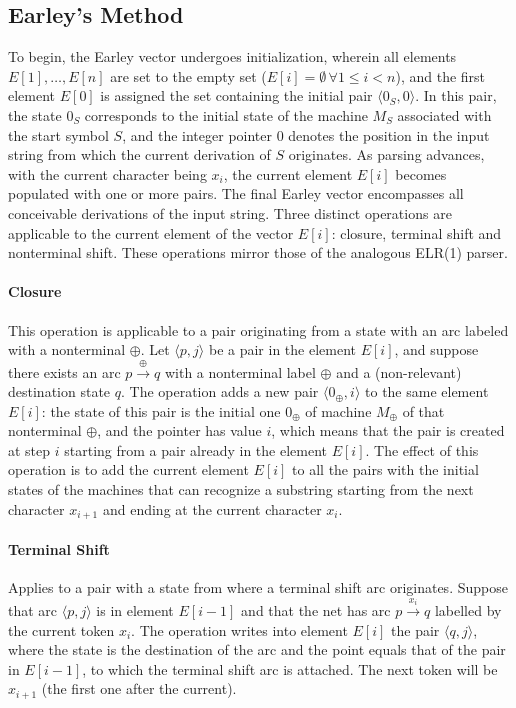 \subsection{Earley's Method}
To begin, the Earley vector undergoes initialization, wherein all elements $E[1],\dots, E[n]$ are set to the empty set ($E[i] = \emptyset \, \forall 1 \leq i < n$), and the first element $E[0]$ is assigned the set containing the initial pair $\langle 0_S, 0 \rangle$. 
In this pair, the state $0_S$ corresponds to the initial state of the machine $M_S$ associated with the start symbol $S$, and the integer pointer $0$ denotes the position in the input string from which the current derivation of $S$ originates.
As parsing advances, with the current character being $x_i$, the current element $E[i]$ becomes populated with one or more pairs.
The final Earley vector encompasses all conceivable derivations of the input string. 
Three distinct operations are applicable to the current element of the vector  $E[i]$: closure, terminal shift and nonterminal shift.
These operations mirror those of the analogous ELR(1) parser.

\paragraph*{Closure}
This operation is applicable to a pair originating from a state with an arc labeled with a nonterminal $\oplus$.
Let $\langle p, j \rangle$ be a pair in the element $E[i]$, and suppose there exists an arc $p \xrightarrow{\oplus} q$ with a nonterminal label $\oplus$ and a (non-relevant) destination state $q$.
The operation adds a new pair $\langle 0_\oplus, i \rangle$ to the same element $E[i]$: the state of this pair is the initial one $0_\oplus$ of machine $M_\oplus$ of that nonterminal $\oplus$, and the pointer has value $i$, which means that the pair is created at step $i$ starting from a pair already in the element $E[i]$.
The effect of this operation is to add the current element $E[i]$ to all the pairs with the initial states of the machines that can recognize a substring starting from the next character $x_{i+1}$ and ending at the current character $x_i$.

\paragraph*{Terminal Shift}
Applies to a pair with a state from where a terminal shift arc originates.
Suppose that arc $\langle p, j \rangle$ is in element $E[i-1]$ and that the net has arc $p \xrightarrow{x_i} q$ labelled by the current token $x_i$.
The operation writes into element $E[i]$ the pair $\langle q, j \rangle$, where the state is the destination of the arc and the point equals that of the pair in $E[i-1]$, to which the terminal shift arc is attached.
The next token will be $x_{i+1}$ (the first one after the current).

